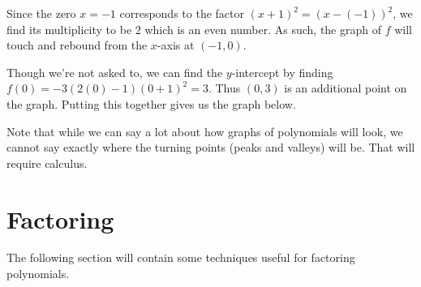 \documentclass{ximera}
\begin{document}
\begin{example}
\begin{explanation}
Since the zero $x=-1$ corresponds to the factor $(x+1)^2 = (x-(-1))^2$, we find its multiplicity to be $2$ which is an even number.  As such, the graph of $f$ will touch and rebound from the $x$-axis at $(-1,0)$.  

Though we're not asked to, we can find the $y$-intercept by finding $f(0) = -3(2(0)-1)(0+1)^2 = 3$.  Thus  $(0,3)$ is an additional point on the graph.  Putting this together gives us the graph below.

\begin{image}
\end{image}

\end{explanation}
\end{example}

Note that while we can say a lot about how graphs of polynomials will look, we cannot say exactly where the turning points (peaks and valleys) will be.  That will require calculus.

\section{Factoring}
The following section will contain some techniques useful for factoring polynomials. 
\end{document}
